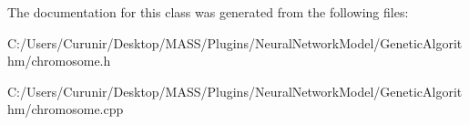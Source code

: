 The documentation for this class was generated from the following files\+:\begin{DoxyCompactItemize}
\item 
C\+:/\+Users/\+Curunir/\+Desktop/\+M\+A\+S\+S/\+Plugins/\+Neural\+Network\+Model/\+Genetic\+Algorithm/chromosome.\+h\item 
C\+:/\+Users/\+Curunir/\+Desktop/\+M\+A\+S\+S/\+Plugins/\+Neural\+Network\+Model/\+Genetic\+Algorithm/chromosome.\+cpp\end{DoxyCompactItemize}
